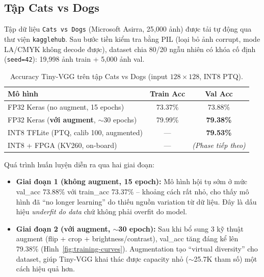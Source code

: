 \subsection{Tập Cats vs Dogs}

Tập dữ liệu \texttt{Cats vs Dogs} (Microsoft Asirra, 25{,}000 ảnh) được tải tự động qua thư viện \texttt{kagglehub}. Sau bước tiền kiểm tra bằng PIL (loại bỏ ảnh corrupt, mode LA/CMYK không decode được), dataset chia 80/20 ngẫu nhiên có khóa cố định (\texttt{seed=42}): 19{,}998 ảnh train + 5{,}000 ảnh val.

\begin{table}[htbp]
    \centering
    \caption{Accuracy Tiny-VGG trên tập Cats vs Dogs (input $128\times128$, INT8 PTQ).}
    \label{tab:catsdogs-accuracy}
    \begin{tabular}{lcc}
        \toprule
        \textbf{Mô hình}                                       & \textbf{Train Acc} & \textbf{Val Acc} \\
        \midrule
        FP32 Keras (no augment, 15 epochs)                     & 73.37\%            & 73.88\%          \\
        FP32 Keras (\textbf{với augment}, $\sim$30 epochs)     & 79.99\%            & \textbf{79.38\%} \\
        INT8 TFLite (PTQ, calib 100, augmented)                & ---                & \textbf{79.53\%} \\
        INT8 + FPGA (KV260, on-board)                          & ---                & {\itshape (Phase tiếp theo)} \\
        \bottomrule
    \end{tabular}
\end{table}

Quá trình huấn luyện diễn ra qua hai giai đoạn:
\begin{itemize}
    \item \textbf{Giai đoạn 1 (không augment, 15 epoch):} Mô hình hội tụ sớm ở mức val\_acc 73.88\% với train\_acc 73.37\% -- khoảng cách rất nhỏ, cho thấy mô hình đã ``no longer learning'' do thiếu nguồn variation từ dữ liệu. Đây là dấu hiệu \textit{underfit do data} chứ không phải overfit do model.
    \item \textbf{Giai đoạn 2 (với augment, $\sim$30 epoch):} Sau khi bổ sung 3 kỹ thuật augment (flip + crop + brightness/contrast), val\_acc tăng đáng kể lên 79.38\% (Hình~\ref{fig:training-curves}). Augmentation tạo ``virtual diversity'' cho dataset, giúp Tiny-VGG khai thác được capacity nhỏ ($\sim$25.7K tham số) một cách hiệu quả hơn.
\end{itemize}


